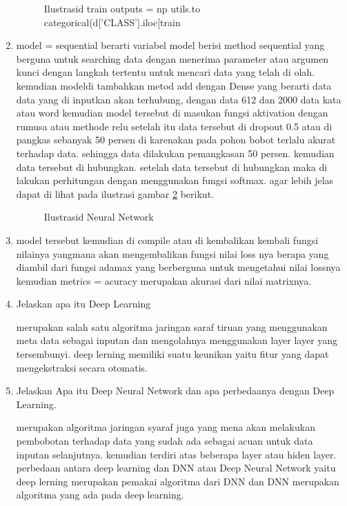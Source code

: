 \begin{enumerate}
\begin{figure}[!htbp]
      \caption{Ilustrasid train outputs = np utils.to categorical(d['CLASS'].iloc[train}
      \label{c138}
      \end{figure}

\item model = sequential berarti variabel model berisi method sequential yang berguna untuk searching data dengan menerima parameter atau argumen kunci dengan langkah tertentu untuk mencari data yang telah di olah. kemudian modeldi tambahkan metod add dengan Dense yang berarti data data yang di inputkan akan terhubung, dengan data 612 dan 2000 data  kata atau word kemudian model tersebut di masukan fungsi aktivation dengan rumusa atau methode relu setelah itu data tersebut di dropout 0.5 atau di pangkas sebanyak 50 persen di karenakan pada pohon bobot terlalu akurat terhadap data. sehingga data dilakukan pemangkasan 50 persen. kemudian data tersebut di hubungkan. setelah data tersebut di hubungkan maka di lakukan perhitungan dengan menggunakan fungsi softmax. agar lebih jelas dapat di lihat pada ilustrasi gambar \ref{c139} berikut.

\begin{figure}[!htbp]
      \caption{Ilustrasid Neural Network}
      \label{c139}
      \end{figure}

\item model tersebut kemudian di compile atau di kembalikan kembali fungsi nilainya yangmana akan mengembalikan fungsi nilai loss nya berapa yang diambil dari fungsi adamax yang berberguna untuk  mengetahui nilai lossnya kemudian metrics = acuracy merupakan akurasi dari nilai matrixnya.

\item Jelaskan apa itu Deep Learning \par
merupakan salah satu algoritma jaringan saraf tiruan yang menggunakan meta data sebagai inputan dan mengolahnya menggunakan layer layer yang tersembunyi. deep lerning memiliki suatu keunikan yaitu fitur yang dapat mengekstraksi secara otomatis.

\item Jelaskan Apa itu Deep Neural Network dan apa perbedaanya dengan Deep Learning.\par
merupakan algoritma jaringan syaraf juga yang mena akan melakukan pembobotan terhadap data yang sudah ada sebagai acuan untuk data inputan selanjutnya. kemudian terdiri atas beberapa layer atau hiden layer. perbedaan antara deep learning dan DNN atau Deep Neural Network yaitu deep lerning merupakan pemakai algoritma dari DNN dan DNN merupakan algoritma yang ada pada deep learning.


\end{enumerate}
